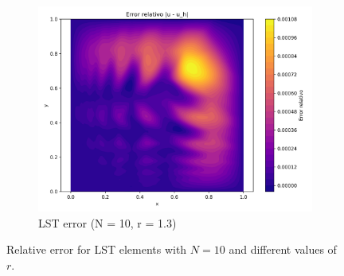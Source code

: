 \documentclass[12pt]{article}
\begin{document}
\begin{figure}[H]
    \hfill
    \begin{subfigure}[t]{0.32\textwidth}
        \centering
        \includegraphics[width=\textwidth]{Graficos/13/LST_relative_error_colormap.png}
        \caption{LST error (N = 10, r = 1.3)}
        \label{fig:lst_error_r1.3}
    \end{subfigure}
    \caption{Relative error for LST elements with $N = 10$ and different values of $r$.}
    \label{fig:lst_error_comparison}
\end{figure}
\end{document}
